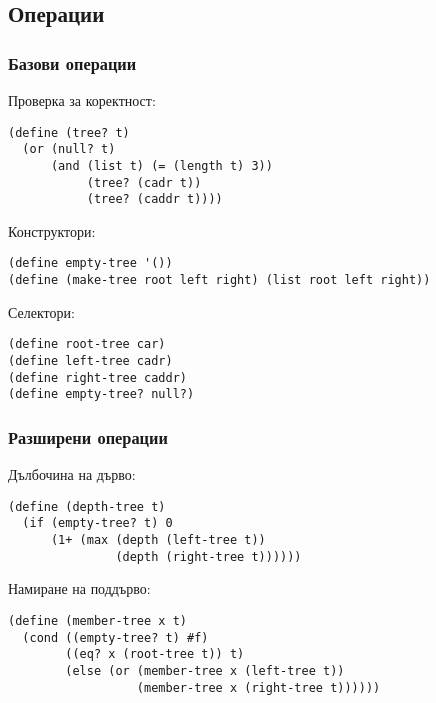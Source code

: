 \documentclass{beamer}
\begin{document}
\subsection{Операции}

\begin{frame}[fragile]
  \frametitle{Базови операции}

  Проверка за коректност:
  \pause
\begin{verbatim}
(define (tree? t)
  (or (null? t)
      (and (list t) (= (length t) 3))
           (tree? (cadr t))
           (tree? (caddr t))))
\end{verbatim}
  \pause
  Конструктори:
  \pause
\begin{verbatim}
(define empty-tree '())
(define (make-tree root left right) (list root left right))
\end{verbatim}
  \pause
  Селектори:
  \pause
\begin{verbatim}
(define root-tree car)
(define left-tree cadr)
(define right-tree caddr)
(define empty-tree? null?)
\end{verbatim}
\end{frame}

\begin{frame}
  \frametitle{Разширени операции}

  Дълбочина на дърво:
  \pause
\begin{verbatim}
(define (depth-tree t)
  (if (empty-tree? t) 0
      (1+ (max (depth (left-tree t))
               (depth (right-tree t))))))
\end{verbatim}
  \pause
  Намиране на поддърво:
  \pause
\begin{verbatim}
(define (member-tree x t)
  (cond ((empty-tree? t) #f)
        ((eq? x (root-tree t)) t)
        (else (or (member-tree x (left-tree t))
                  (member-tree x (right-tree t))))))
\end{verbatim}
\end{frame}
\end{document}

